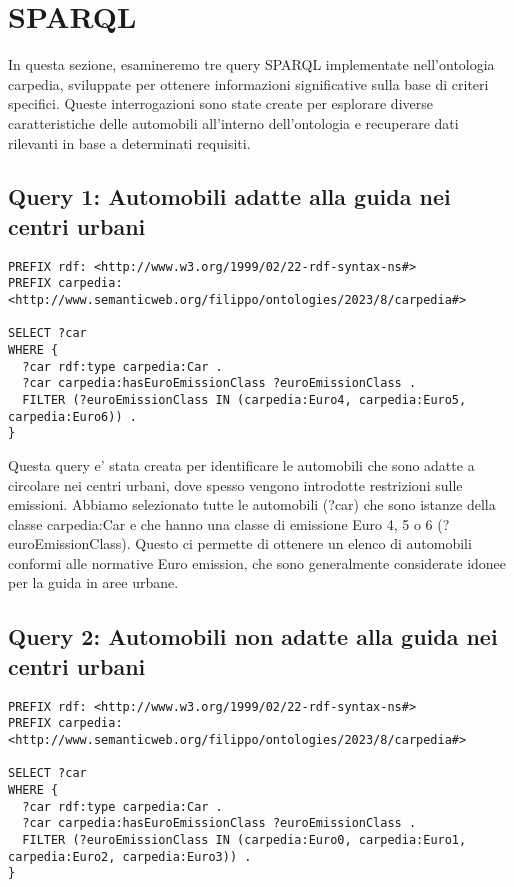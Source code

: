 \section{SPARQL}\label{sec:sparql}

In questa sezione, esamineremo tre query SPARQL implementate nell'ontologia carpedia,
sviluppate per ottenere informazioni significative sulla base di criteri specifici.
Queste interrogazioni sono state create per esplorare diverse caratteristiche delle automobili all'interno
dell'ontologia e recuperare dati rilevanti in base a determinati requisiti.

\subsection{Query 1: Automobili adatte alla guida nei centri urbani}

\begin{verbatim}
PREFIX rdf: <http://www.w3.org/1999/02/22-rdf-syntax-ns#>
PREFIX carpedia: <http://www.semanticweb.org/filippo/ontologies/2023/8/carpedia#>

SELECT ?car
WHERE {
  ?car rdf:type carpedia:Car .
  ?car carpedia:hasEuroEmissionClass ?euroEmissionClass .
  FILTER (?euroEmissionClass IN (carpedia:Euro4, carpedia:Euro5, carpedia:Euro6)) .
}
\end{verbatim}


Questa query e' stata creata per identificare le automobili che sono adatte a circolare nei centri urbani,
dove spesso vengono introdotte restrizioni sulle emissioni.
Abbiamo selezionato tutte le automobili (?car) che sono istanze della classe carpedia:Car e che hanno una
classe di emissione Euro 4, 5 o 6 (?euroEmissionClass).
Questo ci permette di ottenere un elenco di automobili conformi alle normative Euro emission, che sono generalmente
considerate idonee per la guida in aree urbane.

\subsection{Query 2: Automobili non adatte alla guida nei centri urbani}

\begin{verbatim}
PREFIX rdf: <http://www.w3.org/1999/02/22-rdf-syntax-ns#>
PREFIX carpedia: <http://www.semanticweb.org/filippo/ontologies/2023/8/carpedia#>

SELECT ?car
WHERE {
  ?car rdf:type carpedia:Car .
  ?car carpedia:hasEuroEmissionClass ?euroEmissionClass .
  FILTER (?euroEmissionClass IN (carpedia:Euro0, carpedia:Euro1, carpedia:Euro2, carpedia:Euro3)) .
}
\end{verbatim}


